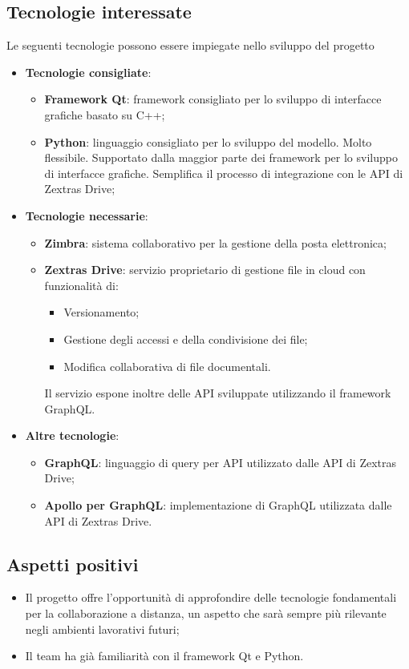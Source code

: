 \subsection{Tecnologie interessate}
Le seguenti tecnologie possono essere impiegate nello sviluppo del progetto
\begin{itemize}
\item \textbf{Tecnologie consigliate}:
\begin{itemize}
	\item \textbf{Framework Qt}: framework consigliato per lo sviluppo di interfacce grafiche basato su C++;
	\item \textbf{Python}: linguaggio consigliato per lo sviluppo del modello. Molto flessibile. Supportato dalla maggior parte dei framework per lo sviluppo di interfacce grafiche. 
	Semplifica il processo di integrazione con le API di Zextras Drive;
	\end{itemize}
\newpage
\item \textbf{Tecnologie necessarie}:
	\begin{itemize}
	\item \textbf{Zimbra}: sistema collaborativo per la gestione della posta elettronica;
	\item \textbf{Zextras Drive}: servizio proprietario di gestione file in cloud con funzionalità di:
		\begin{itemize}
		\item Versionamento;
		\item Gestione degli accessi e della condivisione dei file;
		\item Modifica collaborativa di file documentali.
		\end{itemize}
	Il servizio espone inoltre delle API sviluppate utilizzando il framework GraphQL.
\end{itemize}
\item \textbf{Altre tecnologie}:
	\begin{itemize}
	\item \textbf{GraphQL}: linguaggio di query per API utilizzato dalle API di Zextras Drive;
	\item \textbf{Apollo per GraphQL}: implementazione di GraphQL utilizzata dalle API di Zextras Drive.
	\end{itemize}
\end{itemize}

\subsection{Aspetti positivi}
\begin{itemize}
\item Il progetto offre l'opportunità di approfondire delle tecnologie fondamentali per la collaborazione a distanza, un aspetto che sarà sempre più rilevante negli ambienti lavorativi futuri;
\item Il team ha già familiarità con il framework Qt e Python.
\end{itemize}

